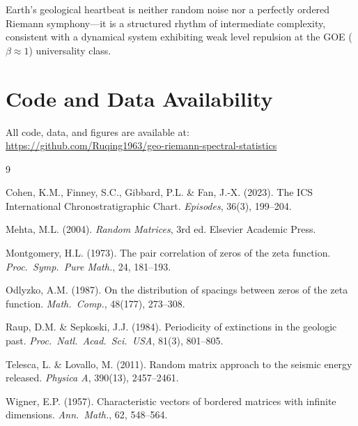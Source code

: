 \documentclass[12pt,a4paper]{article}
\begin{document}
Earth's geological heartbeat is neither random noise nor a perfectly ordered Riemann symphony---it is a structured rhythm of intermediate complexity, consistent with a dynamical system exhibiting weak level repulsion at the GOE ($\beta \approx 1$) universality class.


\section*{Code and Data Availability}

All code, data, and figures are available at: \\
\url{https://github.com/Ruqing1963/geo-riemann-spectral-statistics}


\begin{thebibliography}{9}

Cohen, K.M., Finney, S.C., Gibbard, P.L. \& Fan, J.-X. (2023).
The ICS International Chronostratigraphic Chart.
\textit{Episodes}, 36(3), 199--204.

Mehta, M.L. (2004).
\textit{Random Matrices}, 3rd ed.
Elsevier Academic Press.

Montgomery, H.L. (1973).
The pair correlation of zeros of the zeta function.
\textit{Proc.\ Symp.\ Pure Math.}, 24, 181--193.

Odlyzko, A.M. (1987).
On the distribution of spacings between zeros of the zeta function.
\textit{Math.\ Comp.}, 48(177), 273--308.

Raup, D.M. \& Sepkoski, J.J. (1984).
Periodicity of extinctions in the geologic past.
\textit{Proc.\ Natl.\ Acad.\ Sci.\ USA}, 81(3), 801--805.

Telesca, L. \& Lovallo, M. (2011).
Random matrix approach to the seismic energy released.
\textit{Physica A}, 390(13), 2457--2461.

Wigner, E.P. (1957).
Characteristic vectors of bordered matrices with infinite dimensions.
\textit{Ann.\ Math.}, 62, 548--564.

\end{thebibliography}
\end{document}
